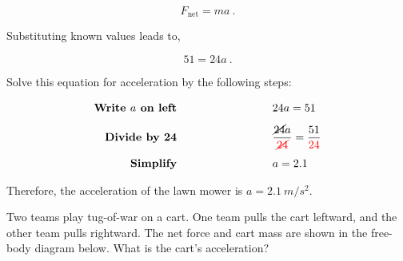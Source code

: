 \documentclass[main.tex]{subfiles}
\begin{document}
\begin{equation*}
    F_{\mathrm{net}} = ma\ .
\end{equation*}

Substituting known values leads to,

\begin{equation*}
    51 = 24 a\ .
\end{equation*}

Solve this equation for acceleration by the following steps:

\begin{align*}
    \textbf{Write $a$ on left} \hspace{9cm} 
    & \hspace{-6cm} 24 a = 51\\[1ex]
    \textbf{Divide by 24} \hspace{9cm}
    & \hspace{-6cm} \frac{\cancel{24}a}{\textcolor{red}{\cancel{24}}} = \frac{51}{\textcolor{red}{24}}\\[1ex]
    \textbf{Simplify} \hspace{9cm}
    & \hspace{-6cm} a = 2.1
\end{align*}

Therefore, the acceleration of the lawn mower is  $a = \SI{2.1}{m/s^2}$.

\endsolution

\begin{example} \label{ex:TugOWar} 
Two teams play tug-of-war on a cart. One team pulls the cart leftward, and the other team pulls rightward. The net force and cart mass are shown in the free-body diagram below. What is the cart's acceleration?
\end{example}

\begin{center}
\end{center}
\end{document}
